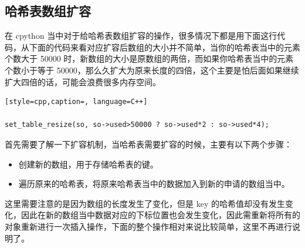 \subsection{哈希表数组扩容}
在 cpython 当中对于给哈希表数组扩容的操作，很多情况下都是用下面这行代码，从下面的代码来看对应扩容后数组的大小并不简单，当你的哈希表当中的元素个数大于 50000 时，新数组的大小是原数组的两倍，而如果你哈希表当中的元素个数小于等于 50000，那么久扩大为原来长度的四倍，这个主要是怕后面如果继续扩大四倍的话，可能会浪费很多内存空间。
\begin{lstlisting}[style=cpp,caption=, language=C++]

set_table_resize(so, so->used>50000 ? so->used*2 : so->used*4);
\end{lstlisting}
首先需要了解一下扩容机制，当哈希表需要扩容的时候，主要有以下两个步骤：
\begin{itemize}
\item 创建新的数组，用于存储哈希表的键。 
\item 遍历原来的哈希表，将原来哈希表当中的数据加入到新的申请的数组当中。 
\end{itemize}
这里需要注意的是因为数组的长度发生了变化，但是 key 的哈希值却没有发生变化，因此在新的数组当中数据对应的下标位置也会发生变化，因此需重新将所有的对象重新进行一次插入操作，下面的整个操作相对来说比较简单，这里不再进行说明了。
